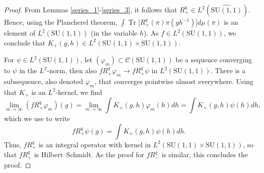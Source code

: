\documentclass[10pt,a4paper]{amsart}
\DeclareMathOperator{\Tr}{Tr}
\begin{document}
\begin{proof}
    From Lemmas \ref{series_1}-\ref{series_3}, it follows that $R_+^q\in L^2(\widehat{\mathrm{SU}(1,1)})$. Hence, using the Plancherel theorem, $\int\Tr\big[R_+^q(\pi)\pi(gh^{-1})\big]d\mu(\pi)$ is an element of $L^2(\mathrm{SU}(1,1))$ (in the variable $h$). As $f\in L^2(\mathrm{SU}(1,1))$, we conclude that $K_+(g,h)\in L^2(\mathrm{SU}(1,1)\times \mathrm{SU}(1,1))$.
    
    For $\psi\in L^2(\mathrm{SU}(1,1))$, let $(\varphi_m)\subset\mathcal{C}(\mathrm{SU}(1,1))$ be a sequence converging to $\psi$ in the $L^2$-norm, then also $fR_+^q \varphi_m\rightarrow fR_+^q\psi$ in $L^2(\mathrm{SU}(1,1))$. There is a subsequence, also denoted $\varphi_m$, that converges pointwise almost everywhere. Using that $K_+$ is an $L^2$-kernel, we find
    \begin{equation*}
        \lim_{m\rightarrow\infty}(fR_+^q\varphi_m)(g)=\lim_{m\rightarrow\infty}\int K_+(g,h)\varphi_m(h)dh=\int K_+(g,h)\psi(h)dh,
    \end{equation*}
    which we use to write
    \begin{equation*}
        fR_+^q\psi(g)=\int K_+(g,h)\psi(h)dh.
    \end{equation*}
    Thus, $fR_+^q$ is an integral operator with kernel in $L^2(\mathrm{SU}(1,1)\times \mathrm{SU}(1,1))$, so that $fR_+^q$ is Hilbert--Schmidt. As the proof for $fR_-^q$ is similar, this concludes the proof.
\end{proof}
\end{document}
